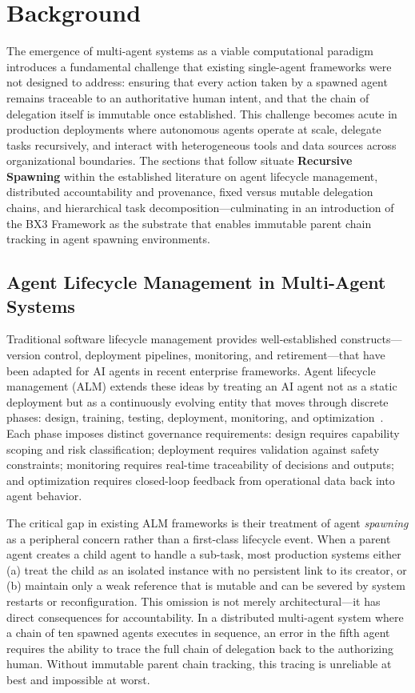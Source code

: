 \section{Background}

The emergence of multi-agent systems as a viable computational paradigm introduces a fundamental challenge that existing single-agent frameworks were not designed to address: ensuring that every action taken by a spawned agent remains traceable to an authoritative human intent, and that the chain of delegation itself is immutable once established. This challenge becomes acute in production deployments where autonomous agents operate at scale, delegate tasks recursively, and interact with heterogeneous tools and data sources across organizational boundaries. The sections that follow situate \textbf{Recursive Spawning} within the established literature on agent lifecycle management, distributed accountability and provenance, fixed versus mutable delegation chains, and hierarchical task decomposition—culminating in an introduction of the BX3 Framework as the substrate that enables immutable parent chain tracking in agent spawning environments.

\subsection{Agent Lifecycle Management in Multi-Agent Systems}

Traditional software lifecycle management provides well-established constructs—version control, deployment pipelines, monitoring, and retirement—that have been adapted for AI agents in recent enterprise frameworks. Agent lifecycle management (ALM) extends these ideas by treating an AI agent not as a static deployment but as a continuously evolving entity that moves through discrete phases: design, training, testing, deployment, monitoring, and optimization~\cite{onereach_alm_2026}. Each phase imposes distinct governance requirements: design requires capability scoping and risk classification; deployment requires validation against safety constraints; monitoring requires real-time traceability of decisions and outputs; and optimization requires closed-loop feedback from operational data back into agent behavior.

The critical gap in existing ALM frameworks is their treatment of agent \textit{spawning} as a peripheral concern rather than a first-class lifecycle event. When a parent agent creates a child agent to handle a sub-task, most production systems either (a) treat the child as an isolated instance with no persistent link to its creator, or (b) maintain only a weak reference that is mutable and can be severed by system restarts or reconfiguration. This omission is not merely architectural—it has direct consequences for accountability. In a distributed multi-agent system where a chain of ten spawned agents executes in sequence, an error in the fifth agent requires the ability to trace the full chain of delegation back to the authorizing human. Without immutable parent chain tracking, this tracing is unreliable at best and impossible at worst.

